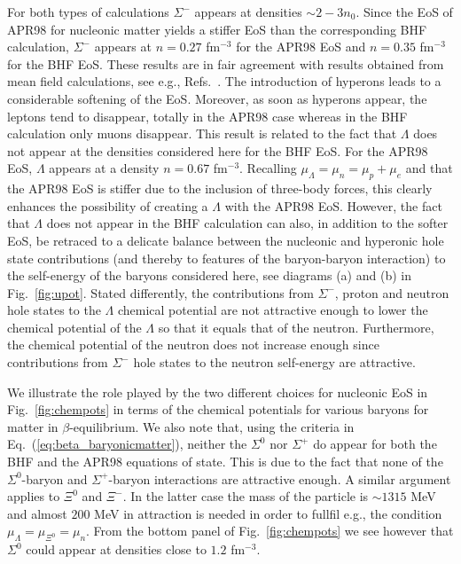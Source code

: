 For both types of calculations $\Sigma^-$ appears at densities $\sim 2-3 n_0$.
Since the  EoS of APR98 for nucleonic matter yields a stiffer EoS than the
corresponding BHF calculation, $\Sigma^-$ appears at 
$n=0.27$ fm$^{-3}$ for the APR98 EoS and $n=0.35$ fm$^{-3}$ for the BHF EoS.
These results are in fair agreement with results obtained from
mean field calculations, see e.g., Refs.\ 
\cite{glen97,prakash97,pke95,ms96}. The introduction
of hyperons leads to a considerable softening of the EoS. 
Moreover, as soon as hyperons appear, the leptons tend to disappear,
totally in the APR98 case whereas in the BHF calculation only muons disappear.
This result is related to the fact that $\Lambda$ does not appear
at the densities considered here for the BHF EoS.
For the APR98 EoS, $\Lambda$ appears at a density $n=0.67$ fm$^{-3}$.
Recalling $\mu_{\Lambda} = \mu_n = \mu_p + \mu_e$ and that the APR98 EoS is stiffer
due to the inclusion of three-body forces, this 
clearly enhances the possibility of creating a $\Lambda$ with the APR98 EoS. 
However, the fact that
$\Lambda$ does not appear in the BHF calculation can also, in addition to the softer
EoS, 
be retraced to a delicate balance between
the nucleonic and hyperonic hole state contributions
(and thereby to features of the baryon-baryon interaction) 
to the self-energy of the baryons considered here, see diagrams (a) and (b) 
in Fig.\ \ref{fig:upot}. Stated differently, the contributions from $\Sigma^-$,
proton and neutron 
hole states to the $\Lambda$ chemical potential are not attractive enough 
to lower the chemical potential of the $\Lambda$ so that it equals
that of the neutron. Furthermore, the chemical potential of the neutron
does not increase enough since contributions
from $\Sigma^-$ hole states to the neutron self-energy are attractive.  

We illustrate the role played by the two different 
choices for nucleonic EoS in 
Fig.\ \ref{fig:chempots} in terms of the chemical potentials for various baryons 
for matter in $\beta$-equilibrium. 
We also note that, using the criteria in Eq.\ (\ref{eq:beta_baryonicmatter}), 
neither the $\Sigma^0$ nor $\Sigma^+$
do appear for both the BHF and the APR98 equations of state. This is due to  the 
fact that none of the $\Sigma^0$-baryon and  $\Sigma^+$-baryon interactions
are attractive enough. A similar argument  applies to $\Xi^0$ and $\Xi^-$. In the latter
case the mass of the particle is $\sim 1315$ MeV and almost $200$ MeV in attraction
is needed in order to fullfil e.g., the condition 
$\mu_{\Lambda} = \mu_{\Xi^0}= \mu_n$. 
 From the bottom panel of Fig.\ \ref{fig:chempots} we see however that $\Sigma^0$
could appear at densities close to $1.2$ fm$^{-3}$.


